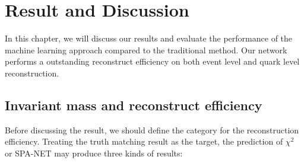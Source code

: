 \chapter{Result and Discussion} \label{Discussion}

In this chapter, we will discuss our results and evaluate the performance of the machine learning approach compared to the traditional method. Our network performs a outstanding reconstruct efficiency on both event level and quark level reconstruction. 

\section{Invariant mass and reconstruct efficiency }\label{sec:inv mass and reco eff}

Before discussing the result, we should define the category for the reconstruction efficiency. Treating the truth matching result as the target, the prediction of $\chi^{2}$ or SPA-NET may produce three kinds of results:


